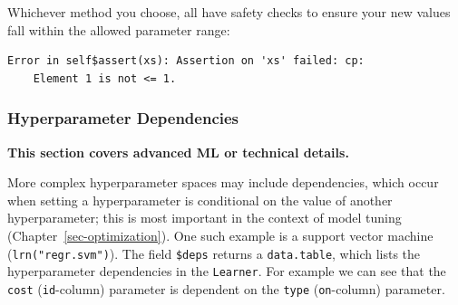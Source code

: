 Whichever method you choose, all have safety checks to ensure your new
values fall within the allowed parameter range:

\begin{Shaded}
\begin{Highlighting}[]
\NormalTok{(}\NormalTok{, } \NormalTok{, } \NormalTok{)}
\end{Highlighting}
\end{Shaded}

\begin{verbatim}
Error in self$assert(xs): Assertion on 'xs' failed: cp:
	Element 1 is not <= 1.
\end{verbatim}

\hypertarget{hyperparameter-dependencies}{%
\subsubsection{Hyperparameter
Dependencies}\label{hyperparameter-dependencies}}

\begin{tcolorbox}[enhanced jigsaw, colframe=quarto-callout-note-color-frame, rightrule=.15mm, bottomrule=.15mm, toprule=.15mm, opacityback=0, colback=white, left=2mm, arc=.35mm, breakable, leftrule=.75mm]
\begin{minipage}[t]{5.5mm}
\textcolor{quarto-callout-note-color}{\faInfo}
\end{minipage}%
\begin{minipage}[t]{\textwidth - 5.5mm}

\textbf{This section covers advanced ML or technical
details.}\vspace{2mm}

\end{minipage}%
\end{tcolorbox}

More complex hyperparameter spaces may include dependencies, which occur
when setting a hyperparameter is conditional on the value of another
hyperparameter; this is most important in the context of model tuning
(Chapter~\ref{sec-optimization}). One such example is a support vector
machine (\texttt{lrn("regr.svm")}). The
field \texttt{\$deps} returns a
\texttt{data.table}, which lists the hyperparameter dependencies in the
\texttt{Learner}. For example we can see that the \texttt{cost}
(\texttt{id}-column) parameter is dependent on the \texttt{type}
(\texttt{on}-column) parameter.

